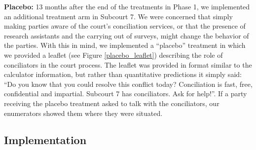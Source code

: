 \documentclass[11pt, a4paper]{article}
\begin{document}
   \vspace{5mm}
\noindent\textbf{Placebo:} 13 months after the end of the treatments in Phase 1, we implemented an additional treatment arm in Subcourt 7. We were concerned that simply making parties aware of the court's conciliation services, or that the presence of research assistants and the carrying out of surveys, might change the behavior of the parties. With this in mind, we implemented a ``placebo'' treatment in which we provided a leaflet (see  Figure \ref{placebo_leaflet}) describing the role of conciliators in the court process. The leaflet was provided in format similar to the calculator information, but rather than quantitative predictions it simply said: ``Do you know that you could resolve this conflict today? Conciliation is fast, free, confidential and impartial. Subcourt 7 has conciliators. Ask for help!''.  If a party receiving the placebo treatment asked to talk with the conciliators, our enumerators showed them where they were situated. 

     
\subsection{Implementation}
     
\end{document}
